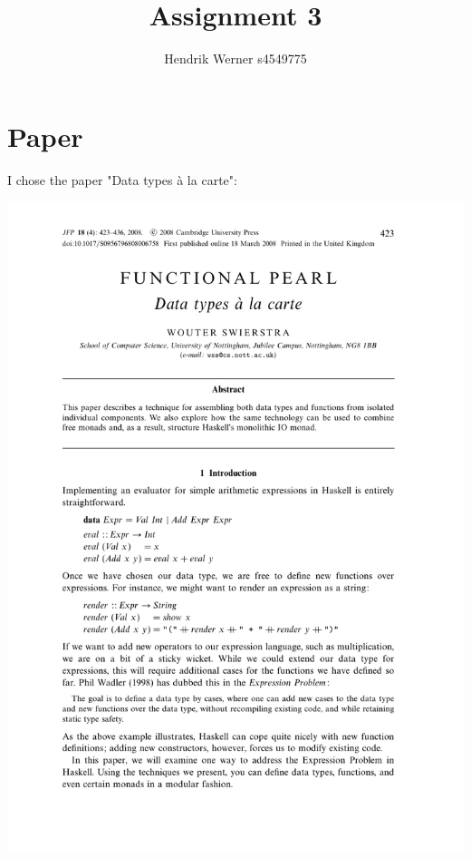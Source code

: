 \documentclass[12pt, a4paper]{article}
\title{Assignment 3}
\author{Hendrik Werner s4549775}
\begin{document}
\maketitle

\section{Paper}
I chose the paper "Data types à la carte":

\includegraphics[page=1]{DataTypesALaCarte}
\end{document}
